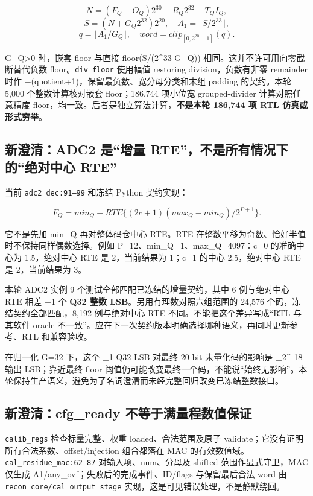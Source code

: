 \documentclass[UTF8,fontset=fandol,10pt,a4paper,openany]{ctexrep}
\newcommand{\code}[1]{\nolinkurl{#1}}
\begin{document}
\[N=(F_Q-O_Q)2^{30}-R_Q2^{32}-T_Q I_Q,\]
\[S=(N+G_Q2^{32})2^{20},\quad A_1=\lfloor S/2^{33}\rfloor,\]
\[q=\lfloor A_1/G_Q\rfloor,\quad word=clip_{[0,2^{20}-1]}(q).\]


G\_Q>0 时，嵌套 floor 与直接 floor(S/(2\textasciicircum{}33 G\_Q)) 相同。这并不许可用向零截断替代负数 floor。\code{div_floor} 使用幅值 restoring division，负数有非零 remainder 时作 \ensuremath{-}(quotient+1)，保留最负数、宽分母分类和末组 padding 的契约。本轮 5,000 个整数计算核对嵌套 floor；186,744 项小位宽 grouped-divider 计算对照任意精度 floor，均一致。后者是独立算法计算，\textbf{不是本轮 186,744 项 RTL 仿真或形式穷举}。


\subsection{新澄清：ADC2 是“增量 RTE”，不是所有情况下的“绝对中心 RTE”}


当前 \code{adc2_dec:91—99} 和冻结 Python 契约实现：


\[F_Q=min_Q+RTE\{(2c+1)(max_Q-min_Q)/2^{P+1}\}.\]


它不是先加 min\_Q 再对整体码仓中心 RTE。RTE 在整数平移为奇数、恰好半值时不保持同样偶数选择。例如 P=12、min\_Q=1、max\_Q=4097：c=0 的准确中心为 1.5，绝对中心 RTE 是 2，当前结果为 1；c=1 的中心 2.5，绝对中心 RTE 是 2，当前结果为 3。


本轮 ADC2 实例 9 个测试全部匹配已冻结的增量契约，其中 6 例与绝对中心 RTE 相差 \ensuremath{\pm}1 个 \textbf{Q32 整数 LSB}。另用有理数对照六组范围的 24,576 个码，冻结契约全部匹配，8,192 例与绝对中心 RTE 不同。不能把这个差异写成“RTL 与其软件 oracle 不一致”。应在下一次契约版本明确选择哪种语义，再同时更新参考、RTL 和兼容验收。


在归一化 G=32 下，这个 \ensuremath{\pm}1 Q32 LSB 对最终 20-bit 未量化码的影响是 \ensuremath{\pm}2\textasciicircum{}-18 输出 LSB；靠近最终 floor 阈值仍可能改变最终一个码，不能说“始终无影响”。本轮保持生产语义，避免为了名词澄清而未经完整回归改变已冻结整数接口。


\subsection{新澄清：cfg\_ready 不等于满量程数值保证}


\code{calib_regs} 检查标量完整、权重 loaded、合法范围及原子 validate；它没有证明所有合法系数、offset/injection 组合都落在 MAC 的有效数值域。\code{cal_residue_mac:62—87} 对输入项、num、分母及 shifted 范围作显式守卫，MAC 仅生成 A1/any\_ovf；失败后的完成事件、ID/flags 与保留最后合法 word 由 \code{recon_core/cal_output_stage} 实现，这是可见错误处理，不是静默绕回。
\end{document}
